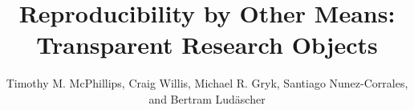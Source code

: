 \documentclass[sigconf,screen,nonacm]{acmart}
\begin{document}
\title[Reproducibility by Other Means]{Reproducibility by Other Means: Transparent Research Objects}

\author{Timothy M. McPhillips, Craig Willis, Michael R. Gryk, Santiago Nunez-Corrales, and Bertram Lud\"ascher}
 

\maketitle
















%
%


\end{document}

